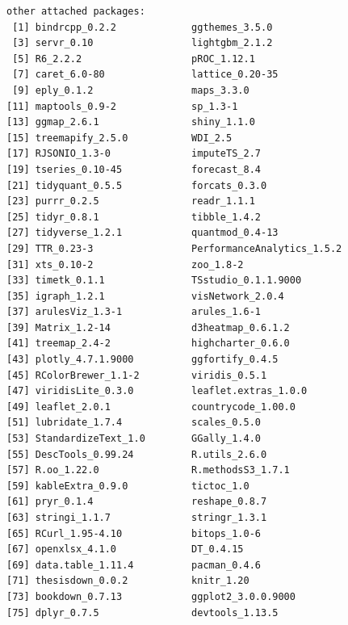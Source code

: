 \documentclass[11pt,oneside,a4paper]{reedthesis}
\begin{document}
\begin{verbatim}
other attached packages:
 [1] bindrcpp_0.2.2             ggthemes_3.5.0            
 [3] servr_0.10                 lightgbm_2.1.2            
 [5] R6_2.2.2                   pROC_1.12.1               
 [7] caret_6.0-80               lattice_0.20-35           
 [9] eply_0.1.2                 maps_3.3.0                
[11] maptools_0.9-2             sp_1.3-1                  
[13] ggmap_2.6.1                shiny_1.1.0               
[15] treemapify_2.5.0           WDI_2.5                   
[17] RJSONIO_1.3-0              imputeTS_2.7              
[19] tseries_0.10-45            forecast_8.4              
[21] tidyquant_0.5.5            forcats_0.3.0             
[23] purrr_0.2.5                readr_1.1.1               
[25] tidyr_0.8.1                tibble_1.4.2              
[27] tidyverse_1.2.1            quantmod_0.4-13           
[29] TTR_0.23-3                 PerformanceAnalytics_1.5.2
[31] xts_0.10-2                 zoo_1.8-2                 
[33] timetk_0.1.1               TSstudio_0.1.1.9000       
[35] igraph_1.2.1               visNetwork_2.0.4          
[37] arulesViz_1.3-1            arules_1.6-1              
[39] Matrix_1.2-14              d3heatmap_0.6.1.2         
[41] treemap_2.4-2              highcharter_0.6.0         
[43] plotly_4.7.1.9000          ggfortify_0.4.5           
[45] RColorBrewer_1.1-2         viridis_0.5.1             
[47] viridisLite_0.3.0          leaflet.extras_1.0.0      
[49] leaflet_2.0.1              countrycode_1.00.0        
[51] lubridate_1.7.4            scales_0.5.0              
[53] StandardizeText_1.0        GGally_1.4.0              
[55] DescTools_0.99.24          R.utils_2.6.0             
[57] R.oo_1.22.0                R.methodsS3_1.7.1         
[59] kableExtra_0.9.0           tictoc_1.0                
[61] pryr_0.1.4                 reshape_0.8.7             
[63] stringi_1.1.7              stringr_1.3.1             
[65] RCurl_1.95-4.10            bitops_1.0-6              
[67] openxlsx_4.1.0             DT_0.4.15                 
[69] data.table_1.11.4          pacman_0.4.6              
[71] thesisdown_0.0.2           knitr_1.20                
[73] bookdown_0.7.13            ggplot2_3.0.0.9000        
[75] dplyr_0.7.5                devtools_1.13.5           


\end{verbatim}
\end{document}
